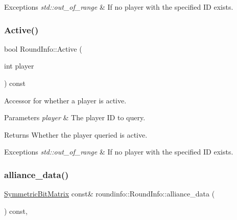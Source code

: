 \begin{DoxyExceptions}{Exceptions}
{\em std\+::out\+\_\+of\+\_\+range} & If no player with the specified ID exists. \\
\hline
\end{DoxyExceptions}
\mbox{\label{classroundinfo_1_1_round_info_a03a7ee40677506160aef2766929e6105}} 
\subsubsection{\texorpdfstring{Active()}{Active()}}
{\footnotesize\ttfamily bool Round\+Info\+::\+Active (\begin{DoxyParamCaption}\item[{int}]{player }\end{DoxyParamCaption}) const}



Accessor for whether a player is active. 


\begin{DoxyParams}{Parameters}
{\em player} & The player ID to query. \\
\hline
\end{DoxyParams}
\begin{DoxyReturn}{Returns}
Whether the player queried is active. 
\end{DoxyReturn}

\begin{DoxyExceptions}{Exceptions}
{\em std\+::out\+\_\+of\+\_\+range} & If no player with the specified ID exists. \\
\hline
\end{DoxyExceptions}
\mbox{\label{classroundinfo_1_1_round_info_ac19e64df26914ffb0292d1c475ce8a23}} 
\subsubsection{\texorpdfstring{alliance\+\_\+data()}{alliance\_data()}\hspace{0.1cm}{\footnotesize\ttfamily [1/2]}}
{\footnotesize\ttfamily \hyperlink{class_symmetric_bit_matrix}{Symmetric\+Bit\+Matrix} const\& roundinfo\+::\+Round\+Info\+::alliance\+\_\+data (\begin{DoxyParamCaption}{ }\end{DoxyParamCaption}) const\hspace{0.3cm}{\ttfamily [inline]}, {\ttfamily [noexcept]}}



